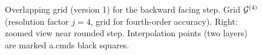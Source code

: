{
\begin{figure}[hbt]
\newcommand{\figWidth}{10cm}
\newcommand{\trimfig}[2]{\trimFigb{#1}{#2}{0.025}{.5}{.375}{.375}}
\newcommand{\figWidtha}{5.5cm}
\newcommand{\trimfiga}[2]{\trimFigb{#1}{#2}{0.0}{.0}{.0}{.0}}
\begin{center}\small
\caption{
Overlapping grid (version 1) 
for the backward facing step. Grid ${\mathcal G}^{(4)}$ (resolution factor $j=4$, grid for fourth-order accuracy). Right: zoomed view near rounded step.
Interpolation points (two layers) are marked a.cmds black squares.
}
\label{fig:backStepGrids}
\end{center}
\end{figure}
}




